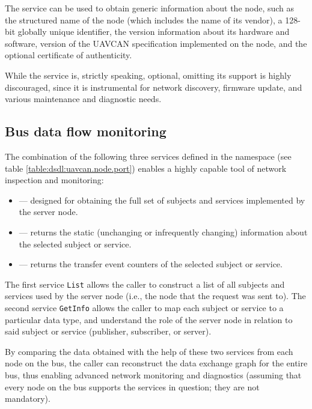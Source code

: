 The service  can be used to obtain generic information about the node,
such as the structured name of the node (which includes the name of its vendor),
a 128-bit globally unique identifier, the version information about its hardware and software,
version of the UAVCAN specification implemented on the node, and the optional certificate of authenticity.

While the service is, strictly speaking, optional, omitting its support is highly discouraged,
since it is instrumental for network discovery, firmware update, and various maintenance and diagnostic needs.


\subsection{Bus data flow monitoring}

The combination of the following three services defined in the namespace 
(see table \ref{table:dsdl:uavcan.node.port}) enables a highly capable tool of network inspection and monitoring:
\begin{itemize}
    \item {} --- designed for obtaining the full set of subjects and services
    implemented by the server node.

    \item {} --- returns the static (unchanging or infrequently changing)
    information about the selected subject or service.

    \item {} --- returns the transfer event counters of
    the selected subject or service.
\end{itemize}

The first service \verb|List| allows the caller to construct a list of all subjects and services used by the
server node (i.e., the node that the request was sent to).
The second service \verb|GetInfo| allows the caller to map each subject or service to a particular data type,
and understand the role of the server node in relation to said subject or service
(publisher, subscriber, or server).

By comparing the data obtained with the help of these two services from each node on the bus,
the caller can reconstruct the data exchange graph for the entire bus,
thus enabling advanced network monitoring and diagnostics
(assuming that every node on the bus supports the services in question; they are not mandatory).

